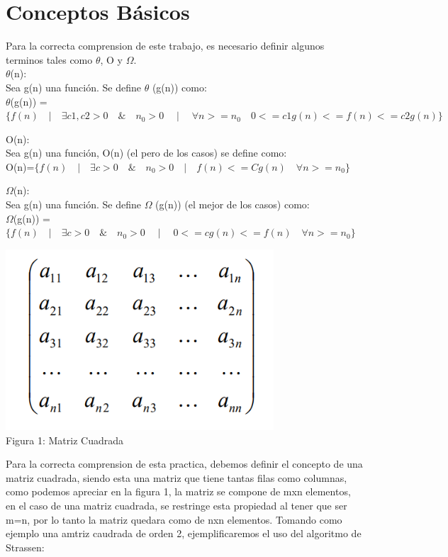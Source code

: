 \documentclass[spanish]{article}
\begin{document}
\newpage
	\section{Conceptos B\'asicos}
	Para la correcta comprension de este trabajo, es necesario definir algunos terminos tales como $\theta$, O y $\Omega$.\\
	 $\theta$(n):\\
		Sea g(n) una función. Se define  $\theta$ (g(n)) como:\\
		
		 	$\theta$(g(n)) = $\{ f(n) \quad | \quad \exists c1,c2>0 \quad \& \quad n_{0}>0 \quad \mid \quad \forall n>=n_{0} \quad 0<= c1g(n) <= f(n) <= c2g(n) \}$
	\bigskip		 	
		 	
	O(n):\\
		Sea  g(n)  una función, O(n) (el pero de los casos) se define como:\\
		
			\hspace{1cm}O(n)=$\{f(n) \quad | \quad \exists c >0 \quad \& \quad n_{0}>0 \quad | \quad f(n) <= Cg(n) \quad \forall  n>= n_{0} \}$
	\bigskip
	
	$\Omega$(n):\\
	Sea  g(n)  una función. Se define $\Omega$ (g(n)) (el mejor de los casos) como:\\

		\hspace{1cm}$\Omega$(g(n)) =$\{f(n) \quad | \quad \exists c >0 \quad \& \quad n_{0}>0 \quad \mid \quad  0<= cg(n)<= f(n) \quad \forall n>= n_{0} \}$
	\bigskip

	\begin{center}
		\includegraphics[width=100mm]{./imagenes/figuno.png}\\
		Figura 1: Matriz Cuadrada
	\end{center}
	Para la correcta comprension de esta practica, debemos definir el concepto de una matriz cuadrada, siendo esta una matriz que 		tiene tantas filas como columnas, como podemos apreciar en la figura 1, la matriz se compone de mxn elementos, en el caso de 		una matriz cuadrada, se restringe esta propiedad al tener que ser m=n, por lo tanto la matriz quedara como de nxn elementos.
\newpage
Tomando como ejemplo una amtriz caudrada de orden 2, ejemplificaremos el uso del algoritmo de Strassen:
\end{document}
